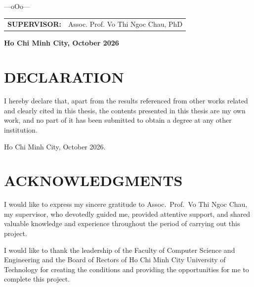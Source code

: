 \documentclass[a4paper]{article}
\begin{document}
\begin{titlepage}
\begin{center}
        \vspace{0.3cm}
        ---oOo---
        \vspace{0.3cm}

        \begin{tabular}{@{}rl@{}}
            \textbf{SUPERVISOR:} & Assoc. Prof. Vo Thi Ngoc Chau, PhD \\
        \end{tabular}
    \end{center}

    \vfill

    \begin{center}
        \textbf{Ho Chi Minh City, October 2026}
    \end{center}
\end{titlepage}



	\pagestyle{fancy} 
	\newpage



    \newpage
\section*{DECLARATION}

I hereby declare that, apart from the results referenced from other works
related and clearly cited in this thesis, the contents presented in this
thesis are my own work, and no part of it has been submitted to obtain a
degree at any other institution.

\vspace{1cm}
\noindent Ho Chi Minh City, October 2026.

\newpage
\section*{ACKNOWLEDGMENTS}

I would like to express my sincere gratitude to Assoc.\ Prof.\ Vo Thi Ngoc Chau, my
supervisor, who devotedly guided me, provided attentive support, and shared
valuable knowledge and experience throughout the period of carrying out
this project.

I would like to thank the leadership of the Faculty of Computer Science
and Engineering and the Board of Rectors of Ho Chi Minh City University of
Technology for creating the conditions and providing the opportunities for
me to complete this project.
\end{document}
